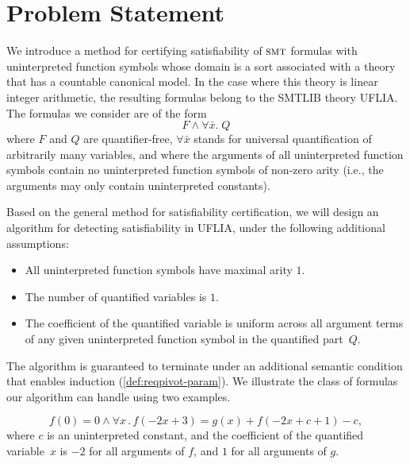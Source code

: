 \documentclass[runningheads]{llncs}
\newcommand{\smt}{\textsc{smt}}
\begin{document}
\section{Problem Statement}
\label{sec:problem-statement}

We introduce a method for certifying satisfiability of $\smt$ formulas with uninterpreted function symbols whose domain is a sort associated with a theory that has a countable canonical model. In the case where this theory is linear integer arithmetic, the resulting formulas belong to the 
SMTLIB theory UFLIA. The formulas we consider are
of the form
\begin{equation}\label{eq:main-fragment}
    F \land \forall \bar{x}.\; Q%
\end{equation}
where $F$ and $Q$ are quantifier‑free,  $\forall \bar{x}$ stands for universal quantification of arbitrarily many variables, and where  the arguments of all uninterpreted function symbols contain no uninterpreted function symbols of non-zero arity (i.e., the arguments may only contain uninterpreted constants).  

Based on the general method for satisfiability certification, we will design an algorithm for detecting satisfiability in UFLIA, under the following additional assumptions:
\begin{itemize}
    \item All uninterpreted function symbols have maximal arity $1$.  
    \item The number of quantified variables is $1$.
    \item The coefficient of the quantified variable is uniform across all argument terms of any given uninterpreted function symbol in the quantified part~$Q$.
    \end{itemize}

The algorithm is guaranteed to terminate under an additional semantic condition that enables induction (\cref{def:reqpivot-param}). We illustrate the class of formulas our algorithm can handle using two examples. 
\begin{example}
  \label{ex:formula}
  \[f(0)=0 \wedge \forall x \,.\, f(-2x+3)=g(x)+f(-2x+c+1)-c,\]
  where $c$ is an uninterpreted constant, and the coefficient of the quantified variable~$x$ is $-2$ for all arguments of $f$, and $1$ for all arguments of $g$.
\end{example}
\end{document}

